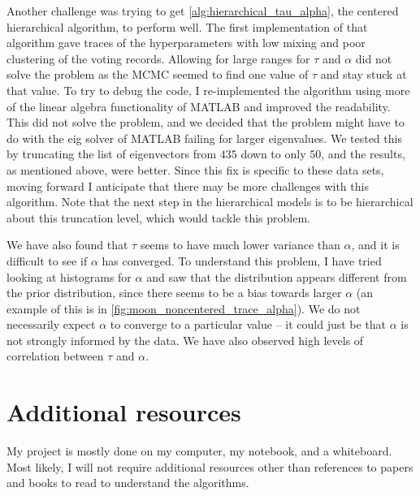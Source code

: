 \documentclass{siamart1116}
\begin{document}
Another challenge was trying to get \cref{alg:hierarchical_tau_alpha}, the centered hierarchical algorithm, to perform well. The first implementation of that algorithm gave traces of the hyperparameters with low mixing and poor clustering of the voting records. Allowing for large ranges for $\tau$ and $\alpha$ did not solve the problem as the MCMC seemed to find one value of $\tau$ and stay stuck at that value. To try to debug the code, I re-implemented the algorithm using more of the linear algebra functionality of MATLAB and improved the readability. This did not solve the problem, and we decided that the problem might have to do with the eig solver of MATLAB failing for larger eigenvalues. We tested this by truncating the list of eigenvectors from $435$ down to only $50$, and the results, as mentioned above, were better. Since this fix is specific to these data sets, moving forward I anticipate that there may be more challenges with this algorithm. Note that the next step in the hierarchical models is to be hierarchical about this truncation level, which would tackle this problem.

We have also found that $\tau$ seems to have much lower variance than $\alpha$, and it is difficult to see if $\alpha$ has converged. To understand this problem, I have tried looking at histograms for $\alpha$ and saw that the distribution appears different from the prior distribution, since there seems to be a bias towards larger $\alpha$ (an example of this is in \cref{fig:moon_noncentered_trace_alpha}). We do not necessarily expect $\alpha$ to converge to a particular value -- it could just be that $\alpha$ is not strongly informed by the data. We have also observed high levels of correlation between $\tau$ and $\alpha$.

\section{Additional resources}
My project is mostly done on my computer, my notebook, and a whiteboard. Most likely, I will not require additional resources other than references to papers and books to read to understand the algorithms.



\end{document}
